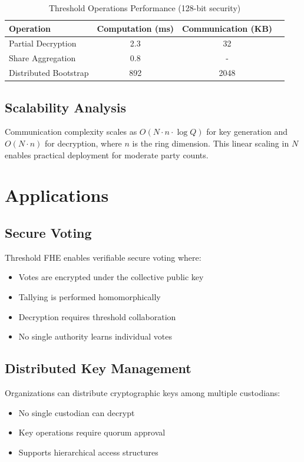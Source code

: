 \documentclass[11pt,a4paper]{article}
\begin{document}
\begin{table}[h]
\centering
\caption{Threshold Operations Performance (128-bit security)}
\begin{tabular}{@{}lccc@{}}
\toprule
Operation & Computation (ms) & Communication (KB) \\
\midrule
Partial Decryption & 2.3 & 32 \\
Share Aggregation & 0.8 & - \\
Distributed Bootstrap & 892 & 2048 \\
\bottomrule
\end{tabular}
\end{table}

\subsection{Scalability Analysis}

Communication complexity scales as $O(N \cdot n \cdot \log Q)$ for key generation and $O(N \cdot n)$ for decryption, where $n$ is the ring dimension. This linear scaling in $N$ enables practical deployment for moderate party counts.

\section{Applications}

\subsection{Secure Voting}

Threshold FHE enables verifiable secure voting where:
\begin{itemize}
    \item Votes are encrypted under the collective public key
    \item Tallying is performed homomorphically
    \item Decryption requires threshold collaboration
    \item No single authority learns individual votes
\end{itemize}

\subsection{Distributed Key Management}

Organizations can distribute cryptographic keys among multiple custodians:
\begin{itemize}
    \item No single custodian can decrypt
    \item Key operations require quorum approval
    \item Supports hierarchical access structures
\end{itemize}
\end{document}

